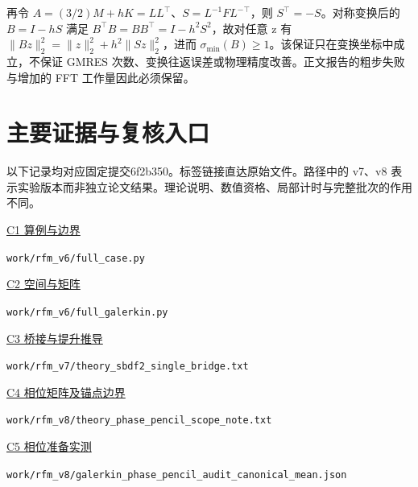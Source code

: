 再令 \(A=(3/2)M+hK=LL^\top\)、\(S=L^{-1}FL^{-\top}\)，则 \(S^\top=-S\)。对称变换后的 \(B=I-hS\) 满足 \(B^\top B=BB^\top=I-h^2S^2\)，故对任意 z 有 \(\|Bz\|_2^2=\|z\|_2^2+h^2\|Sz\|_2^2\)，进而 \(\sigma_{\min}(B)\ge1\)。该保证只在变换坐标中成立，不保证 GMRES 次数、变换往返误差或物理精度改善。正文报告的粗步失败与增加的 FFT 工作量因此必须保留。

\section{主要证据与复核入口}\label{sec:app-evidence}

以下记录均对应固定提交6f2b350。标签链接直达原始文件。路径中的 v7、v8 表示实验版本而非独立论文结果。理论说明、数值资格、局部计时与完整批次的作用不同。

\noindent\href{https://github.com/LStar404/rfm-navier-stokes-research/blob/6f2b3500964d3d5153b8400018236c4702ef94f8/work/rfm_v6/full_case.py}{C1 算例与边界}\par\nopagebreak
{\small\nolinkurl{work/rfm_v6/full_case.py}}\par\smallskip

\noindent\href{https://github.com/LStar404/rfm-navier-stokes-research/blob/6f2b3500964d3d5153b8400018236c4702ef94f8/work/rfm_v6/full_galerkin.py}{C2 空间与矩阵}\par\nopagebreak
{\small\nolinkurl{work/rfm_v6/full_galerkin.py}}\par\smallskip

\noindent\href{https://github.com/LStar404/rfm-navier-stokes-research/blob/6f2b3500964d3d5153b8400018236c4702ef94f8/work/rfm_v7/theory_sbdf2_single_bridge.txt}{C3 桥接与提升推导}\par\nopagebreak
{\small\nolinkurl{work/rfm_v7/theory_sbdf2_single_bridge.txt}}\par\smallskip

\noindent\href{https://github.com/LStar404/rfm-navier-stokes-research/blob/6f2b3500964d3d5153b8400018236c4702ef94f8/work/rfm_v8/theory_phase_pencil_scope_note.txt}{C4 相位矩阵及锚点边界}\par\nopagebreak
{\small\nolinkurl{work/rfm_v8/theory_phase_pencil_scope_note.txt}}\par\smallskip

\noindent\href{https://github.com/LStar404/rfm-navier-stokes-research/blob/6f2b3500964d3d5153b8400018236c4702ef94f8/work/rfm_v8/galerkin_phase_pencil_audit_canonical_mean.json}{C5 相位准备实测}\par\nopagebreak
{\small\nolinkurl{work/rfm_v8/galerkin_phase_pencil_audit_canonical_mean.json}}\par\smallskip

